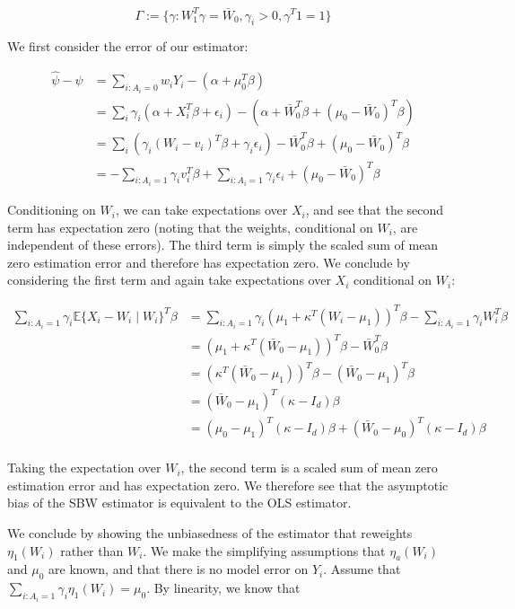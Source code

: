 \documentclass[12pt]{article}
\begin{document}
$$
\Gamma := \{\gamma: W_1^T\gamma = \bar{W}_0, \gamma_i > 0, \gamma^T1 = 1\}
$$

We first consider the error of our estimator:

\begin{align*}
    \hat{\psi} - \psi &= \sum_{i: A_i = 0}w_iY_i - (\alpha + \mu_0^T\beta) \\
    &= \sum_i \gamma_i(\alpha + X_i^T\beta + \epsilon_i) - (\alpha + \bar{W}_0^T\beta + (\mu_0 - \bar{W}_0)^T\beta) \\
    &= \sum_i (\gamma_i(W_i - v_i)^T\beta + \gamma_i\epsilon_i) - \bar{W}_0^T\beta + (\mu_0 - \bar{W}_0)^T\beta \\
    &= -\sum_{i: A_i = 1}\gamma_iv_i^T\beta + \sum_{i: A_i = 1}\gamma_i\epsilon_i  + (\mu_0 - \bar{W}_0)^T\beta
\end{align*}

Conditioning on $W_i$, we can take expectations over $X_i$, and see that the second term has expectation zero (noting that the weights, conditional on $W_i$, are independent of these errors). The third term is simply the scaled sum of mean zero estimation error and therefore has expectation zero. We conclude by considering the first term and again take expectations over $X_i$ conditional on $W_i$: 

\begin{align*}
    \sum_{i: A_i = 1} \gamma_i\mathbb{E}\{X_i - W_i \mid W_i\}^T\beta &= \sum_{i: A_i = 1} \gamma_i (\mu_1 + \kappa^T(W_i - \mu_1))^T\beta - \sum_{i: A_i = 1}\gamma_i W_i^T\beta \\
    &= (\mu_1 + \kappa^T(\bar{W}_0 - \mu_1))^T\beta - \bar{W}_0^T\beta \\
    &= (\kappa^T(\bar{W}_0 - \mu_1))^T\beta - (\bar{W}_0 - \mu_1)^T\beta  \\
    &= (\bar{W}_0 - \mu_1)^T(\kappa - I_d)\beta \\
    &= (\mu_0 - \mu_1)^T(\kappa - I_d)\beta + (\bar{W}_0 - \mu_0)^T(\kappa - I_d)\beta \\
\end{align*}

Taking the expectation over $W_i$, the second term is a scaled sum of mean zero estimation error and has expectation zero. We therefore see that the asymptotic bias of the SBW estimator is equivalent to the OLS estimator.

We conclude by showing the unbiasedness of the estimator that reweights $\eta_1(W_i)$ rather than $W_i$. We make the simplifying assumptions that $\eta_a(W_i)$ and $\mu_0$ are known, and that there is no model error on $Y_i$. Assume that $\sum_{i: A_i = 1}\gamma_i\eta_1(W_i) = \mu_0$. By linearity, we know that
\end{document}
